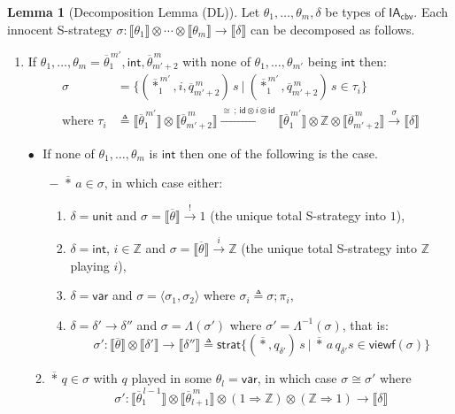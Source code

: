\documentclass{CSML}
\theoremstyle{definition}\newtheorem{definition}[thm]{Definition}
\theoremstyle{definition}\newtheorem{example}[thm]{Example}
\theoremstyle{definition}\newtheorem{proposition}[thm]{Proposition}
\theoremstyle{definition}\newtheorem{lemma}[thm]{Lemma}
\theoremstyle{definition}\newtheorem{theorem}[thm]{Theorem}
\theoremstyle{definition}\newtheorem{corollary}[thm]{Corollary}
\theoremstyle{definition}\newtheorem{remark}[thm]{Remark}
\newcommand\defn{\triangleq}
\newcommand\arr{\rightarrow}
\newcommand\Arr{\Rightarrow}
\renewcommand\int{\mathsf{int}}
\newcommand\var{\mathsf{var}}
\newcommand\ang[1]{\langle#1\rangle}
\newcommand\one{1}
\newcommand\id{\mathsf{id}}
\newcommand\viewf{\mathsf{viewf}}
\newcommand\strat{\mathsf{strat}}
\newcommand\Z{\mathbb{Z}}
\newcommand\iacbv{\mathsf{IA}_{\mathsf{cbv}}}
\newcommand\comt{\mathsf{unit}}
\newcommand\sem[1]{\llbracket #1 \rrbracket}
\begin{document}
\begin{lemma}[Decomposition Lemma (DL)] Let $\theta_1,\dots,\theta_m,\delta$ be types of $\iacbv$.
Each innocent S-strategy $\sigma:\sem{\theta_1}\otimes\cdots\otimes\sem{\theta_m}\arr\sem{\delta}$ can be decomposed as follows.
\begin{enumerate}[label=\bf\arabic*.]
  \item If $\theta_1,\dots,\theta_m=\overline{\theta}_1^{\,m'},\int,\overline{\theta}_{m'+2}^{\,m}$ with none of $\theta_1,\dots,\theta_{m'}$ being $\int$ then:
\begin{align*} 
\sigma &= \{(\overline{*}_1^{\,m'},i,\overline{q}_{m'+2}^{\,m})\,s\ |\ (\overline{*}_1^{\,m'},\overline{q}_{m'+2}^{\,m})\,s\in\tau_i\}\\
\text{where\ }
\tau_i &\defn \sem{\overline{\theta}_1^{\,m'}}\otimes\sem{\overline{\theta}_{m'+2}^{\,m}}\xrightarrow{\cong\,;\,\id\otimes i\otimes\id} \sem{\overline{\theta}_1^{\,m'}}\otimes \Z\otimes\sem{\overline{\theta}_{m'+2}^{\,m}}\xrightarrow{\sigma}\sem{\delta}
\end{align*}
  \item[$\bullet$\,\,] If none of $\theta_1,\dots,\theta_m$ is $\int$ then one of the following is the case.
  \begin{enumerate}[label=\bf\arabic*.,start=6]
    \item[$-$] $\overline{*}\,a\in\sigma$, in which case either:
    \begin{enumerate}[label=\bf\arabic*.,start=2]
      \item $\delta=\comt$ and $\sigma=\sem{\overline{\theta}}\xrightarrow{!}\one$ (the unique total S-strategy into $\one$),
      \item $\delta=\int$, $i\in\Z$ and $\sigma=\sem{\overline{\theta}}\xrightarrow{i}\Z$ (the unique total S-strategy into $\Z$ playing $i$),
      \item $\delta=\var$ and $\sigma=\ang{\sigma_1,\sigma_2}$ where $\sigma_i\defn\sigma;\pi_i$,
      \item $\delta=\delta'\arr \delta''$ and $\sigma=\Lambda(\sigma')$ where $\sigma'=\Lambda^{-1}(\sigma)$, that is:
      \[ \sigma':\sem{\overline{\theta}}\otimes\sem{\delta'}\arr\sem{\delta''}\defn\strat\{(\overline{*},q_{\delta'})\,s\ |\ \overline{*}\,a\,q_{\delta'}s\in\viewf(\sigma)\} \]
    \end{enumerate}
  \item $\overline{*}\,q\in\sigma$ with $q$ played in some $\theta_l=\var$, in which case $\sigma\cong\sigma'$ where 
\[ \sigma':\sem{\overline{\theta}_1^{\,l-1}}\otimes\sem{\overline{\theta}_{l+1}^{\,m}}\otimes(1\Arr\Z)\otimes(\Z\Arr1)\longrightarrow\sem{\delta}
\]
\end{enumerate}
\end{enumerate}
\end{lemma}
\end{document}
